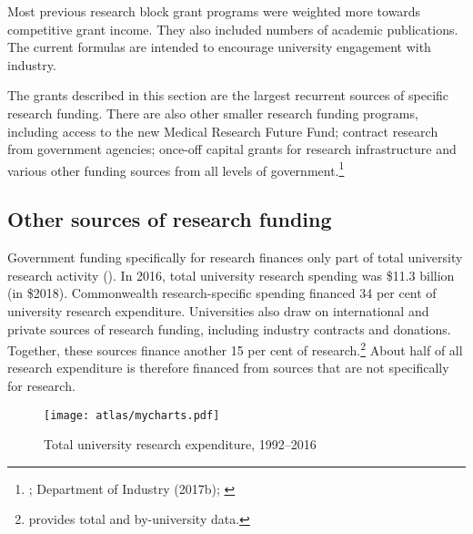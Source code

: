 \documentclass{grattan}
\begin{document}
Most previous research block grant programs were weighted more towards competitive grant income. They also included numbers of academic publications. The current formulas are intended to encourage university engagement with industry.

The grants described in this section are the largest recurrent sources of specific research funding. There are also other smaller research funding programs, including access to the new Medical Research Future Fund; contract research from government agencies; once-off capital grants for research infrastructure and various other funding sources from all levels of government.\footnote{\textcite[][]{DepartmentofEducationandTraining2017finance2016finan}; Department of Industry (2017b); \textcite[][]{DepartmentofHealth2018medicalresearchfu}}

%
\subsection{Other sources of research funding}\label{subsec:other-sources-of-research-funding}

Government funding specifically for research finances only part of total university research activity (). In 2016, total university research spending was \$11.3 billion (in \$2018). Commonwealth research-specific spending financed 34 per cent of university research expenditure. Universities also draw on international and private sources of research funding, including industry contracts and donations. Together, these sources finance another 15 per cent of research.\footnote{\textcite[][]{DepartmentofEducationandTraining2017researchincometim} provides total and by-university data.} About half of all research expenditure is therefore financed from sources that are not specifically for research.

    \begin{figure} %
    \caption{Total university research expenditure, 1992--2016}\label{fig:total-university-research-expenditure-19922016}
    \texttt{[image: atlas/mycharts.pdf]}
    \end{figure}
\end{document}
